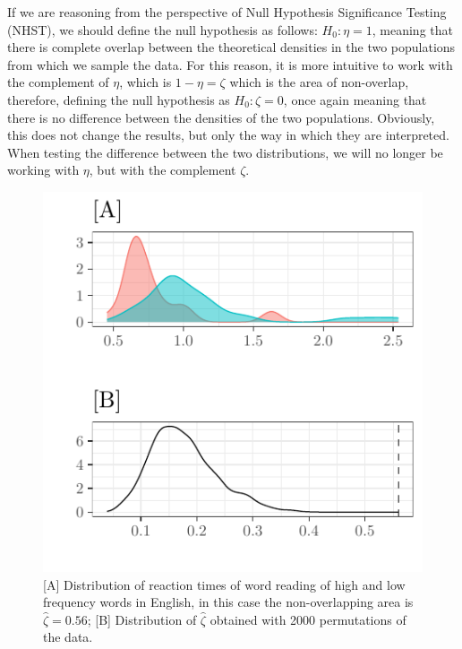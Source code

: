 \documentclass[twocolumn]{article}\usepackage[]{graphicx}\usepackage[]{xcolor}
\makeatletter
\def\maxwidth{ %
  \ifdim\Gin@nat@width>\linewidth
    \linewidth
  \else
    \Gin@nat@width
  \fi
}
\newenvironment{knitrout}{}{} %
\makeatother
\begin{document}

If we are reasoning from the perspective of Null Hypothesis Significance Testing (NHST), we should define the null hypothesis as follows: $H_0: \eta = 1$,  meaning that there is complete overlap between the theoretical densities in the two populations from which we sample the data. For this reason, it is more intuitive to work with the complement of $\eta$, which is  $1-\eta = \zeta$ which is the area of non-overlap, therefore, defining the null hypothesis as  $H_0:\zeta = 0$, once again meaning that there is no difference between the densities of the two populations. Obviously, this does not change the results, but only the way in which they are interpreted. When testing the difference between the two distributions, we will no longer be working with $\eta$, but with the complement $\zeta$. 








\begin{knitrout}
\color{fgcolor}\begin{figure}[!t]

{\centering \includegraphics[width=\maxwidth]{figure/ex2-1} 

}

\caption{[A] Distribution of reaction times of word reading of high and low frequency words in English, in this case the non-overlapping area is $\hat{\zeta} = 0.56$; [B] Distribution of $\hat{\zeta}$ obtained with 2000 permutations of the data.}\label{fig:ex2}
\end{figure}

\end{knitrout}
\end{document}
